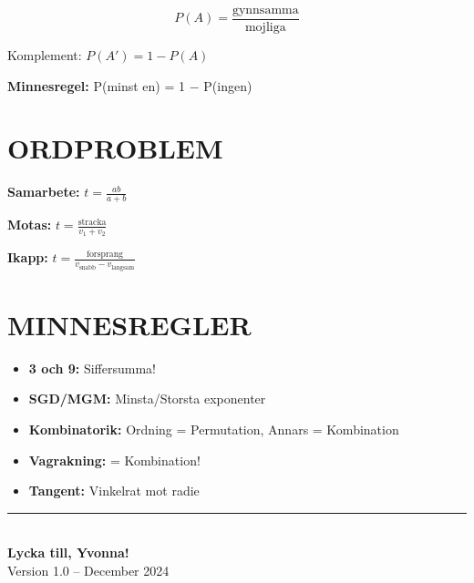 \documentclass[11pt,a4paper]{article}
\begin{document}
\[ P(A) = \frac{\text{gynnsamma}}{\text{mojliga}} \]

Komplement: $P(A') = 1 - P(A)$

\textbf{Minnesregel:} P(minst en) = 1 $-$ P(ingen)

\section{ORDPROBLEM}

\textbf{Samarbete:} $t = \frac{ab}{a+b}$

\textbf{Motas:} $t = \frac{\text{stracka}}{v_1 + v_2}$

\textbf{Ikapp:} $t = \frac{\text{forsprang}}{v_{\text{snabb}} - v_{\text{langsam}}}$

\section{MINNESREGLER}

\begin{itemize}
\item \textbf{3 och 9:} Siffersumma!
\item \textbf{SGD/MGM:} Minsta/Storsta exponenter
\item \textbf{Kombinatorik:} Ordning = Permutation, Annars = Kombination
\item \textbf{Vagrakning:} = Kombination!
\item \textbf{Tangent:} Vinkelrat mot radie
\end{itemize}

\vfill
\begin{center}
\rule{10cm}{0.5pt}\\[0.5cm]
{\Large\textbf{Lycka till, Yvonna!}}\\
Version 1.0 -- December 2024
\end{center}
\end{document}
